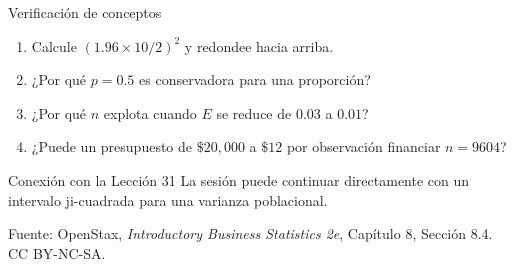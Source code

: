 \documentclass[aspectratio=169,10pt,spanish]{beamer}
\begin{document}
\begin{frame}{Verificación de conceptos}
  \begin{enumerate}
    \item Calcule $(1.96\times 10/2)^{2}$ y redondee hacia arriba.
    \item ¿Por qué $p=0.5$ es conservadora para una proporción?
    \item ¿Por qué $n$ explota cuando $E$ se reduce de $0.03$ a $0.01$?
    \item ¿Puede un presupuesto de $\$20{,}000$ a $\$12$ por observación
      financiar $n=9604$?
  \end{enumerate}

  \vspace{0.6em}
  \begin{block}{Conexión con la Lección 31}
    La sesión puede continuar directamente con un intervalo ji-cuadrada
    para una varianza poblacional.
  \end{block}

  \vfill
  \scriptsize Fuente: OpenStax, \textit{Introductory Business Statistics 2e},
  Capítulo 8, Sección 8.4. CC BY-NC-SA.
\end{frame}

\appendix
\end{document}
